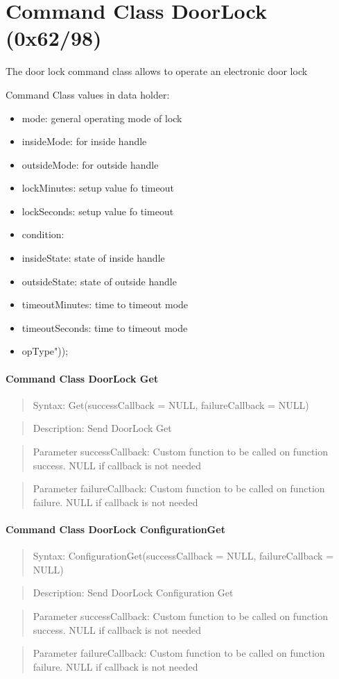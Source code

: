 \section{Command Class DoorLock (0x62/98)}

The door lock command class allows to operate an electronic door lock

Command Class values in data holder:
\begin{itemize}
\item mode: general operating mode of lock
\item insideMode: for inside handle
\item outsideMode: for outside handle
\item lockMinutes: setup value fo timeout
\item lockSeconds: setup value fo timeout
\item condition:
\item insideState: state of inside handle
\item outsideState: state of outside handle
\item timeoutMinutes: time to timeout mode
\item timeoutSeconds: time to timeout mode
\item opType"));
\end{itemize}
 
\paragraph {Command Class DoorLock Get}
\begin{quote} Syntax: Get(successCallback = NULL, failureCallback = NULL)\end{quote}
\begin{quote} Description: Send DoorLock Get\end{quote}
\begin{quote} Parameter successCallback: Custom function to be called on function success. NULL if callback is not needed\end{quote}
\begin{quote} Parameter failureCallback: Custom function to be called on function failure. NULL if callback is not needed\end{quote}

\paragraph {Command Class DoorLock ConfigurationGet}
\begin{quote} Syntax: ConfigurationGet(successCallback = NULL, failureCallback = NULL)\end{quote}
\begin{quote} Description: Send DoorLock Configuration Get\end{quote}
\begin{quote} Parameter successCallback: Custom function to be called on function success. NULL if callback is not needed\end{quote}
\begin{quote} Parameter failureCallback: Custom function to be called on function failure. NULL if callback is not needed\end{quote}

